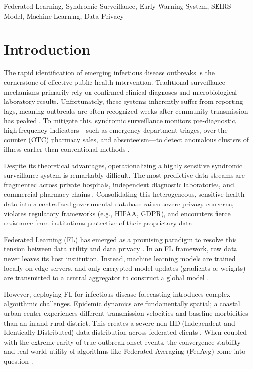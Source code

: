 \documentclass[conference]{IEEEtran}
\begin{document}
\begin{IEEEkeywords}
Federated Learning, Syndromic Surveillance, Early Warning System, SEIRS Model, Machine Learning, Data Privacy
\end{IEEEkeywords}

\section{Introduction}
The rapid identification of emerging infectious disease outbreaks is the cornerstone of effective public health intervention. Traditional surveillance mechanisms primarily rely on confirmed clinical diagnoses and microbiological laboratory results. Unfortunately, these systems inherently suffer from reporting lags, meaning outbreaks are often recognized weeks after community transmission has peaked \cite{b1}. To mitigate this, syndromic surveillance monitors pre-diagnostic, high-frequency indicators—such as emergency department triages, over-the-counter (OTC) pharmacy sales, and absenteeism—to detect anomalous clusters of illness earlier than conventional methods \cite{b2}.

Despite its theoretical advantages, operationalizing a highly sensitive syndromic surveillance system is remarkably difficult. The most predictive data streams are fragmented across private hospitals, independent diagnostic laboratories, and commercial pharmacy chains \cite{b3}. Consolidating this heterogeneous, sensitive health data into a centralized governmental database raises severe privacy concerns, violates regulatory frameworks (e.g., HIPAA, GDPR), and encounters fierce resistance from institutions protective of their proprietary data \cite{b4}.

Federated Learning (FL) has emerged as a promising paradigm to resolve this tension between data utility and data privacy \cite{b5}. In an FL framework, raw data never leaves its host institution. Instead, machine learning models are trained locally on edge servers, and only encrypted model updates (gradients or weights) are transmitted to a central aggregator to construct a global model \cite{b6}. 

However, deploying FL for infectious disease forecasting introduces complex algorithmic challenges. Epidemic dynamics are fundamentally spatial; a coastal urban center experiences different transmission velocities and baseline morbidities than an inland rural district. This creates a severe non-IID (Independent and Identically Distributed) data distribution across federated clients \cite{b7}. When coupled with the extreme rarity of true outbreak onset events, the convergence stability and real-world utility of algorithms like Federated Averaging (FedAvg) come into question \cite{b8}.
\end{document}
